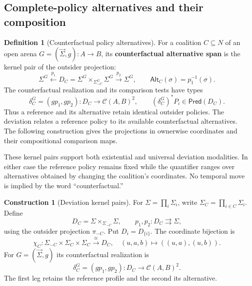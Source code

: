 \documentclass[11pt,a4paper]{article}
\numberwithin{equation}{section}
\theoremstyle{definition}
\newtheorem{definition}[theorem]{Definition}
\newtheorem{construction}[construction]{Construction}
\theoremstyle{remark}
\theoremstyle{plain}
\begin{document}
\subsection{Complete-policy alternatives and their composition}

\begin{definition}[Counterfactual policy alternatives]
\label{def:egt-counterfactual}
For a coalition $C\subseteq N$ of an open arena
$G=(\vec\Sigma,g):A\to B$, its \textbf{counterfactual alternative
span} is the kernel pair of the outsider projection:
\[
 \Sigma^G\xleftarrow{p_1}
 D_C=\Sigma^G\times_{\Sigma_{-C}^G}\Sigma^G
 \xrightarrow{p_2}\Sigma^G,\qquad
 \mathsf{Alt}_C(\sigma)=p_1^{-1}(\sigma).
\]
The counterfactual realization and its comparison tests have types
\[
 \delta_C^G=(gp_1,gp_2):D_C\to\mathcal C(A,B)^2,
 \qquad (\delta_C^G)^*P_i\in\mathsf{Pred}(D_C).
\]
Thus a reference and its alternative retain identical outsider policies.
The deviation relates a reference policy to its available counterfactual alternatives. The following construction gives the projections in ownerwise
coordinates and their compositional comparison maps.
\end{definition}
These kernel pairs support both existential and universal deviation
modalities. In either case the reference policy remains fixed while the
quantifier ranges over alternatives obtained by changing the coalition's
coordinates. No temporal move is implied by the word
``counterfactual.''

\begin{construction}[Deviation kernel pairs]
For $\Sigma=\prod_i\Sigma_i$, write $\Sigma_C=\prod_{i\in C}\Sigma_i$.
Define
\begin{equation}\label{eq:egt-deviation-kernel}
 D_C=\Sigma\times_{\Sigma_{-C}}\Sigma,
 \qquad p_1,p_2:D_C\rightrightarrows\Sigma,
\end{equation}
using the outsider projection $\pi_{-C}$. Put $D_i=D_{\{i\}}$.
The coordinate bijection is
\begin{equation}\label{eq:egt-deviation-coordinates}
 \chi_C:\Sigma_{-C}\times\Sigma_C\times\Sigma_C\xrightarrow{\cong}D_C,
 \quad (u,a,b)\longmapsto((u,a),(u,b)).
\end{equation}
For $G=(\vec\Sigma,g)$ its counterfactual realization is
\begin{equation}\label{eq:egt-delta-C}
 \delta_C^G=(gp_1,gp_2):D_C\to\mathcal C(A,B)^2.
\end{equation}
The first leg retains the reference profile and the second its alternative.
\end{construction}
\end{document}
